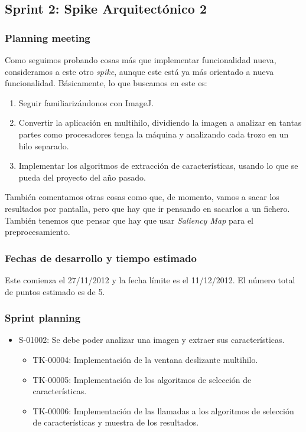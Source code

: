 \subsection{Sprint 2: Spike Arquitectónico 2}
\subsubsection*{Planning meeting}
Como seguimos probando cosas más que implementar funcionalidad nueva, consideramos a este \sprint{} otro \textit{spike}, aunque este está ya más orientado a nueva funcionalidad. Básicamente, lo que buscamos en este \sprint{} es:

\begin{enumerate}
\item Seguir familiarizándonos con ImageJ.
\item Convertir la aplicación en multihilo, dividiendo la imagen a analizar en tantas partes como procesadores tenga la máquina y analizando cada trozo en un hilo separado.
\item Implementar los algoritmos de extracción de características, usando lo que se pueda del proyecto del año pasado.
\end{enumerate}

También comentamos otras cosas como que, de momento, vamos a sacar los resultados por pantalla, pero que hay que ir pensando en sacarlos a un fichero. También tenemos que pensar que hay que usar \textit{Saliency Map} para el preprocesamiento.

\subsubsection*{Fechas de desarrollo y tiempo estimado}
Este \sprint{} comienza el 27/11/2012 y la fecha límite es el 11/12/2012. El número total de puntos estimado es de 5.

\subsubsection*{Sprint planning}
\begin{itemize}
\item S-01002: Se debe poder analizar una imagen y extraer sus características.
	\begin{itemize}
	\item TK-00004: Implementación de la ventana deslizante multihilo.
	\item TK-00005: Implementación de los algoritmos de selección de características.
	\item TK-00006: Implementación de las llamadas a los algoritmos de selección de características y muestra de los resultados.
	\end{itemize}
\end{itemize}


